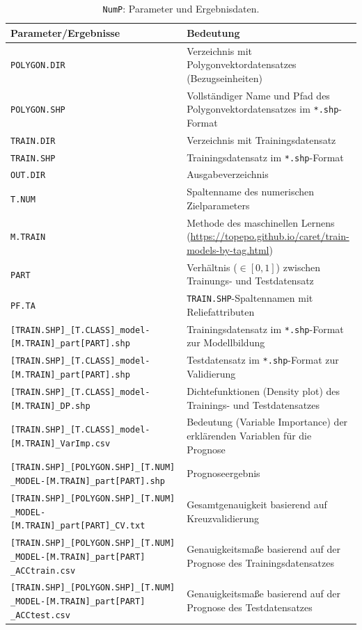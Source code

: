 \begin{table}[p]
	\caption{\texttt{NumP}: Parameter und Ergebnisdaten.}
	\centering
	\begin{tabularx}{\textwidth}{X|X}
		\toprule
		\textbf{Parameter/Ergebnisse} & \textbf{Bedeutung} \\
		\midrule
		\texttt{POLYGON.DIR} & Verzeichnis mit Polygonvektordatensatzes (Bezugseinheiten) \\ \midrule
		\texttt{POLYGON.SHP} & Vollständiger Name und Pfad des Polygonvektordatensatzes im \texttt{*.shp}-Format\\ \midrule
		\texttt{TRAIN.DIR} & Verzeichnis mit Trainingsdatensatz\\\midrule
		\texttt{TRAIN.SHP} & Trainingsdatensatz  im \texttt{*.shp}-Format\\\midrule
		\texttt{OUT.DIR} & Ausgabeverzeichnis \\\midrule
		\texttt{T.NUM} & Spaltenname des numerischen Zielparameters\\\midrule
		\texttt{M.TRAIN} & Methode des maschinellen Lernens (\url{https://topepo.github.io/caret/train-models-by-tag.html})\\\midrule
		\texttt{PART} & Verhältnis ($\in[0,1]$) zwischen Trainungs- und Testdatensatz\\\midrule
		\texttt{PF.TA} & \texttt{TRAIN.SHP}-Spaltennamen mit Reliefattributen\\\midrule\midrule
		\texttt{[TRAIN.SHP]\_[T.CLASS]\_model- [M.TRAIN]\_part[PART].shp} & Trainingsdatensatz im \texttt{*.shp}-Format zur Modellbildung\\\midrule
		\texttt{[TRAIN.SHP]\_[T.CLASS]\_model- [M.TRAIN]\_part[PART].shp} & Testdatensatz im \texttt{*.shp}-Format zur Validierung\\\midrule
		\texttt{[TRAIN.SHP]\_[T.CLASS]\_model- [M.TRAIN]\_DP.shp} & Dichtefunktionen (Density plot) des Trainings- und Testdatensatzes\\\midrule
		\texttt{[TRAIN.SHP]\_[T.CLASS]\_model- [M.TRAIN]\_VarImp.csv} & Bedeutung (Variable Importance) der erklärenden Variablen für die Prognose\\\midrule
		\texttt{[TRAIN.SHP]\_[POLYGON.SHP]\_[T.NUM] \_MODEL-[M.TRAIN]\_part[PART].shp} & Prognoseergebnis\\\midrule
		\texttt{[TRAIN.SHP]\_[POLYGON.SHP]\_[T.NUM] \_MODEL-[M.TRAIN]\_part[PART]\_CV.txt} & Gesamtgenauigkeit basierend auf Kreuzvalidierung\\\midrule
		\texttt{[TRAIN.SHP]\_[POLYGON.SHP]\_[T.NUM] \_MODEL-[M.TRAIN]\_part[PART] \_ACCtrain.csv} & Genauigkeitsmaße basierend auf der Prognose des Trainingsdatensatzes\\\bottomrule
		\texttt{[TRAIN.SHP]\_[POLYGON.SHP]\_[T.NUM] \_MODEL-[M.TRAIN]\_part[PART] \_ACCtest.csv} & Genauigkeitsmaße basierend auf der Prognose des Testdatensatzes\\\bottomrule
	\end{tabularx}%
	\label{tab:fNumP}%
\end{table}



